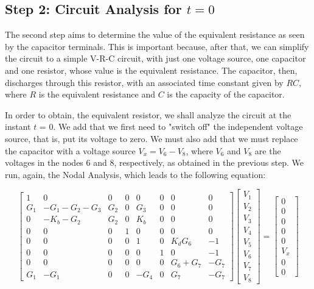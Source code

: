 \subsection{Step 2: Circuit Analysis for $t = 0$}

The second step aims to determine the value of the equivalent resistance as seen by the capacitor terminals. This is important because, after that, we can simplify the circuit to a simple V-R-C circuit, with just one voltage source, one capacitor and one resistor, whose value is the equivalent resistance. The capacitor, then, discharges through this resistor, with an associated time constant given by $RC$, where $R$ is the equivalent resistance and $C$ is the capacity of the capacitor.

In order to obtain, the equivalent resistor, we shall analyze the circuit at the instant $t$ = 0. We add that we first need to "switch off" the independent voltage source, that is, put its voltage to zero. We must also add that we must replace the capacitor with a voltage source $V_x = V_6 - V_8$, where $V_6$ and $V_8$ are the voltages in the nodes 6 and 8, respectively, as obtained in the previous step. We run, again, the Nodal Analysis, which leads to the following equation:  

\begin{equation}
	\begin{bmatrix}
		1 & 0 & 0 & 0 & 0 & 0 & 0 & 0 \\
		G_1 & -G_1 - G_2 -G_3 & G_2 & 0 & G_3 & 0 & 0 & 0 \\
		0 & -K_b - G_2 & G_2 & 0 & K_b & 0 & 0 & 0 \\
		0 & 0 & 0 & 1 & 0 & 0 & 0 & 0 \\
		0 & 0 & 0 & 0 & 1 & 0 & K_dG_6 & -1 \\
		0 & 0 & 0 & 0 & 0 & 1 & 0 & -1 \\
		0 & 0 & 0 & 0 & 0 & 0 & G_6 + G_7 & -G_7 \\
		G_1 & -G_1 & 0 & 0 & -G_4 & 0 & G_7 & -G_7 
	\end{bmatrix}
	\begin{bmatrix}
		V_1 \\
		V_2 \\
		V_3 \\
		V_4 \\
		V_5 \\
		V_6 \\
		V_7 \\
		V_8
	\end{bmatrix}
	=  
	\begin{bmatrix}
		0 \\
		0 \\
		0 \\
		0 \\
		0 \\
		V_x \\
		0 \\
		0
	\end{bmatrix}
\end{equation}


